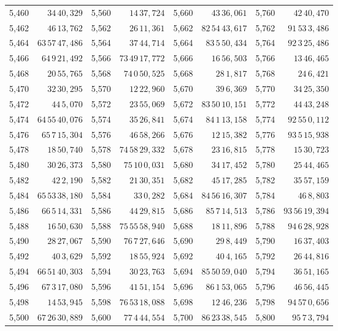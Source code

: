 \begin{tabular}{|r|r||r|r||r|r||r|r|}
5,460 & \(34\,40,\!329\) & 5,560 & \(14\,37,\!724\) & 5,660 & \(43\,36,\!061\) & 5,760 & \(42\,40,\!470\) \\[1pt]
5,462 & \(46\,13,\!762\) & 5,562 & \(26\,11,\!361\) & 5,662 & \(82\,54\,43,\!617\) & 5,762 & \(91\,53\,3,\!486\) \\
5,464 & \(63\,57\,47,\!486\) & 5,564 & \(37\,44,\!714\) & 5,664 & \(83\,5\,50,\!434\) & 5,764 & \(92\,3\,25,\!486\) \\
5,466 & \(64\,9\,21,\!492\) & 5,566 & \(73\,49\,17,\!772\) & 5,666 & \(16\,56,\!503\) & 5,766 & \(13\,46,\!465\) \\
5,468 & \(20\,55,\!765\) & 5,568 & \(74\,0\,50,\!525\) & 5,668 & \(28\,1,\!817\) & 5,768 & \(24\,6,\!421\) \\
5,470 & \(32\,30,\!295\) & 5,570 & \(12\,22,\!960\) & 5,670 & \(39\,6,\!369\) & 5,770 & \(34\,25,\!350\) \\[1pt]
5,472 & \(44\,5,\!070\) & 5,572 & \(23\,55,\!069\) & 5,672 & \(83\,50\,10,\!151\) & 5,772 & \(44\,43,\!248\) \\
5,474 & \(64\,55\,40,\!076\) & 5,574 & \(35\,26,\!841\) & 5,674 & \(84\,1\,13,\!158\) & 5,774 & \(92\,55\,0,\!112\) \\
5,476 & \(65\,7\,15,\!304\) & 5,576 & \(46\,58,\!266\) & 5,676 & \(12\,15,\!382\) & 5,776 & \(93\,5\,15,\!938\) \\
5,478 & \(18\,50,\!740\) & 5,578 & \(74\,58\,29,\!332\) & 5,678 & \(23\,16,\!815\) & 5,778 & \(15\,30,\!723\) \\
5,480 & \(30\,26,\!373\) & 5,580 & \(75\,10\,0,\!031\) & 5,680 & \(34\,17,\!452\) & 5,780 & \(25\,44,\!465\) \\[1pt]
5,482 & \(42\,2,\!190\) & 5,582 & \(21\,30,\!351\) & 5,682 & \(45\,17,\!285\) & 5,782 & \(35\,57,\!159\) \\
5,484 & \(65\,53\,38,\!180\) & 5,584 & \(33\,0,\!282\) & 5,684 & \(84\,56\,16,\!307\) & 5,784 & \(46\,8,\!803\) \\
5,486 & \(66\,5\,14,\!331\) & 5,586 & \(44\,29,\!815\) & 5,686 & \(85\,7\,14,\!513\) & 5,786 & \(93\,56\,19,\!394\) \\
5,488 & \(16\,50,\!630\) & 5,588 & \(75\,55\,58,\!940\) & 5,688 & \(18\,11,\!896\) & 5,788 & \(94\,6\,28,\!928\) \\
5,490 & \(28\,27,\!067\) & 5,590 & \(76\,7\,27,\!646\) & 5,690 & \(29\,8,\!449\) & 5,790 & \(16\,37,\!403\) \\[1pt]
5,492 & \(40\,3,\!629\) & 5,592 & \(18\,55,\!924\) & 5,692 & \(40\,4,\!165\) & 5,792 & \(26\,44,\!816\) \\
5,494 & \(66\,51\,40,\!303\) & 5,594 & \(30\,23,\!763\) & 5,694 & \(85\,50\,59,\!040\) & 5,794 & \(36\,51,\!165\) \\
5,496 & \(67\,3\,17,\!080\) & 5,596 & \(41\,51,\!154\) & 5,696 & \(86\,1\,53,\!065\) & 5,796 & \(46\,56,\!445\) \\
5,498 & \(14\,53,\!945\) & 5,598 & \(76\,53\,18,\!088\) & 5,698 & \(12\,46,\!236\) & 5,798 & \(94\,57\,0,\!656\) \\
5,500 & \(67\,26\,30,\!889\) & 5,600 & \(77\,4\,44,\!554\) & 5,700 & \(86\,23\,38,\!545\) & 5,800 & \(95\,7\,3,\!794\) \\
\hline
\end{tabular}\par
\endgroup
\clearpage
